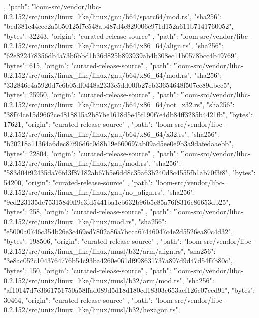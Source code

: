 {{    },
    {
      "path": "loom-src/vendor/libc-0.2.152/src/unix/linux_like/linux/gnu/b64/sparc64/mod.rs",
      "sha256": "bed381c44cec2a5b50125f7e548ab487d4c829006c971d152a611b7141760052",
      "bytes": 32243,
      "origin": "curated-release-source"
    },
    {
      "path": "loom-src/vendor/libc-0.2.152/src/unix/linux_like/linux/gnu/b64/x86_64/align.rs",
      "sha256": "62e822478356db4a73b6bbd1b36d825b893939ab4b308ec11b0578bcc4b49769",
      "bytes": 615,
      "origin": "curated-release-source"
    },
    {
      "path": "loom-src/vendor/libc-0.2.152/src/unix/linux_like/linux/gnu/b64/x86_64/mod.rs",
      "sha256": "332846e4a5920d7e6b05df0448a2333c5dd00fb27cb33654648f507ee89dbec5",
      "bytes": 25950,
      "origin": "curated-release-source"
    },
    {
      "path": "loom-src/vendor/libc-0.2.152/src/unix/linux_like/linux/gnu/b64/x86_64/not_x32.rs",
      "sha256": "38f74ce15d9662ce4818815a2b87be1618d5e45f190f7e4db84ff3285b4421fb",
      "bytes": 17621,
      "origin": "curated-release-source"
    },
    {
      "path": "loom-src/vendor/libc-0.2.152/src/unix/linux_like/linux/gnu/b64/x86_64/x32.rs",
      "sha256": "b20218a11364a6dec87f96d6c0d8b19e660697ab09ad5ee0e9b3a9dafedaaebb",
      "bytes": 22804,
      "origin": "curated-release-source"
    },
    {
      "path": "loom-src/vendor/libc-0.2.152/src/unix/linux_like/linux/gnu/mod.rs",
      "sha256": "583d04f92435da76fd3f87182ab67b5e6dd8c35a63b240d8c4555fb1ab70f3f8",
      "bytes": 54200,
      "origin": "curated-release-source"
    },
    {
      "path": "loom-src/vendor/libc-0.2.152/src/unix/linux_like/linux/gnu/no_align.rs",
      "sha256": "9cd223135de75315840ff9c3fd5441ba1cb632b96b5c85a76f8316c86653db25",
      "bytes": 258,
      "origin": "curated-release-source"
    },
    {
      "path": "loom-src/vendor/libc-0.2.152/src/unix/linux_like/linux/mod.rs",
      "sha256": "e5000a0746c354b26e3c469ed7802a86a7bcca67446047c4e2d5526ea80c4d32",
      "bytes": 198506,
      "origin": "curated-release-source"
    },
    {
      "path": "loom-src/vendor/libc-0.2.152/src/unix/linux_like/linux/musl/b32/arm/align.rs",
      "sha256": "3e8ac052c1043764776b54c93ba4260e061df998631737a897d9d47d54f7b80c",
      "bytes": 150,
      "origin": "curated-release-source"
    },
    {
      "path": "loom-src/vendor/libc-0.2.152/src/unix/linux_like/linux/musl/b32/arm/mod.rs",
      "sha256": "af10147d7c3661751750a58ffad089d5d18d180cd18303c653aef126c07ccd91",
      "bytes": 30464,
      "origin": "curated-release-source"
    },
    {
      "path": "loom-src/vendor/libc-0.2.152/src/unix/linux_like/linux/musl/b32/hexagon.rs",
}}
